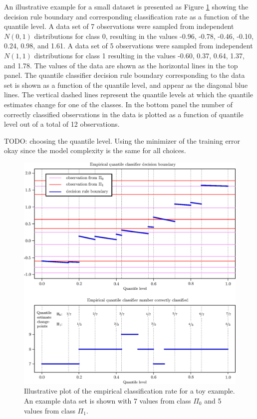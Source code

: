 An illustrative example for a small dataset is presented as Figure
\ref{fig:empirical-classification-rate} showing the decision rule boundary and
corresponding classification rate as a function of the quantile level.  A data
set of 7 observations were sampled from independent $N(0, 1)$ distributions for
class 0, resulting in the values -0.96, -0.78, -0.46, -0.10, 0.24, 0.98, and
1.61.  A data set of 5 observations were sampled from independent $N(1, 1)$
distributions for class 1 resulting in the values -0.60, 0.37, 0.64, 1.37, and
1.78.  The values of the data are shown as the horizontal lines in the top
panel.  The quantile classifier decision rule boundary corresponding to the data
set is shown as a function of the quantile level, and appear as the diagonal
blue lines.  The vertical dashed lines represent the quantile levels at which
the quantile estimates change for one of the classes.  In the bottom panel the
number of correctly classified observations in the data is plotted as a function
of quantile level out of a total of 12 observations.

TODO: choosing the quantile level.  Using the minimizer of the training error
okay since the model complexity is the same for all choices.


\begin{figure}[p]
  \caption[Example empirical classification rate]{Illustrative plot of the
    empirical classification rate for a toy example.  An example data set is
    shown with 7 values from class $\Pi_0$ and 5 values from class $\Pi_1$. }
  \label{fig:empirical-classification-rate}
  \centering
  \vspace{5mm}

  \includegraphics[width=1\textwidth]{emp_quant_example}
\end{figure}


